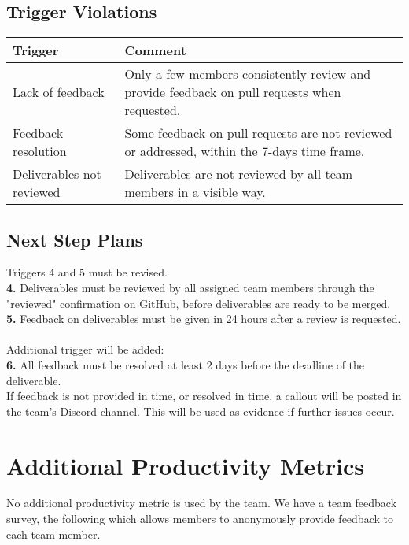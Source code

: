 \documentclass{article}
\begin{document}
\subsection{Trigger Violations}
\begin{table}[H]
\centering
\begin{tabular}{p{3cm} p{10cm}}
\toprule
\textbf{Trigger} & \textbf{Comment}\\
\midrule
Lack of feedback & Only a few members consistently review and provide feedback on pull requests when requested.\\
Feedback resolution & Some feedback on pull requests are not reviewed or addressed, within the 7-days time frame.\\
Deliverables not reviewed & Deliverables are not reviewed by all team members in a visible way.\\
\bottomrule
\end{tabular}
\end{table}

\subsection{Next Step Plans}
Triggers 4 and 5 must be revised. \\
\textbf{4.} Deliverables must be reviewed by all assigned team members through the "reviewed" confirmation on GitHub, before deliverables are ready to be merged. \\
\textbf{5.} Feedback on deliverables must be given in 24 hours after a review is requested. 
\\\\
Additional trigger will be added:\\
\textbf{6.} All feedback must be resolved at least 2 days before the deadline of the deliverable.\\
If feedback is not provided in time, or resolved in time, a callout will be posted in the team's Discord channel. This will be used as evidence if further issues occur.
\section{Additional Productivity Metrics}
No additional productivity metric is used by the team. We have a team feedback survey, the following which allows members to anonymously provide feedback to each team member.
\end{document}
